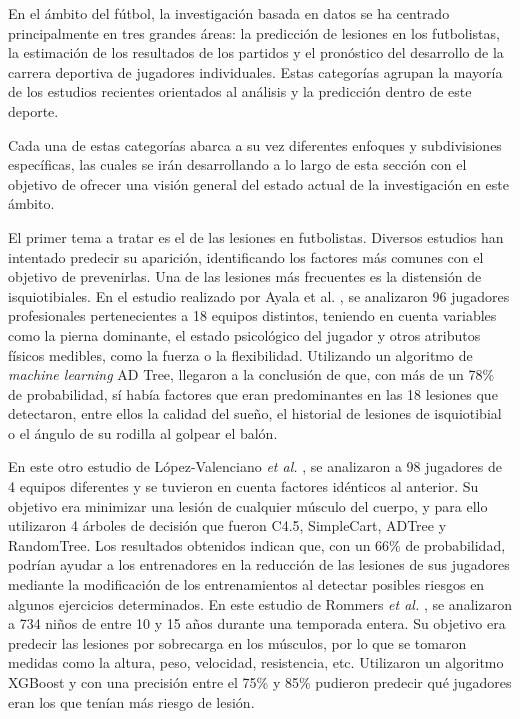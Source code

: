 En el ámbito del fútbol, la investigación basada en datos se ha centrado principalmente en tres grandes áreas: la predicción de lesiones en los futbolistas, la estimación de los resultados de los partidos y el pronóstico del desarrollo de la carrera deportiva de jugadores individuales. Estas categorías agrupan la mayoría de los estudios recientes orientados al análisis y la predicción dentro de este deporte.

Cada una de estas categorías abarca a su vez diferentes enfoques y subdivisiones específicas, las cuales se irán desarrollando a lo largo de esta sección con el objetivo de ofrecer una visión general del estado actual de la investigación en este ámbito.

El primer tema a tratar es el de las lesiones en futbolistas. Diversos estudios han intentado predecir su aparición, identificando los factores más comunes con el objetivo de prevenirlas. Una de las lesiones más frecuentes es la distensión de isquiotibiales. En el estudio realizado por Ayala et al. \cite{first-injury}, se analizaron 96 jugadores profesionales pertenecientes a 18 equipos distintos, teniendo en cuenta variables como la pierna dominante, el estado psicológico del jugador y otros atributos físicos medibles, como la fuerza o la flexibilidad. Utilizando un algoritmo de \textit{machine learning} AD Tree, llegaron a la conclusión de que, con más de un 78\% de probabilidad, sí había factores que eran predominantes en las 18 lesiones que detectaron, entre ellos la calidad del sueño, el historial de lesiones de isquiotibial o el ángulo de su rodilla al golpear el balón.

En este otro estudio de López-Valenciano \textit{et al.} \cite{second-injury}, se analizaron a 98 jugadores de 4 equipos diferentes y se tuvieron en cuenta factores idénticos al anterior. Su objetivo era minimizar una lesión de cualquier músculo del cuerpo, y para ello utilizaron 4 árboles de decisión que fueron C4.5, SimpleCart, ADTree y RandomTree. Los resultados obtenidos indican que, con un 66\% de probabilidad, podrían ayudar a los entrenadores en la reducción de las lesiones de sus jugadores mediante la modificación de los entrenamientos al detectar posibles riesgos en algunos ejercicios determinados. En este estudio de Rommers \textit{et al.} \cite{third-injury}, se analizaron a 734 niños de entre 10 y 15 años durante una temporada entera. Su objetivo era predecir las lesiones por sobrecarga en los músculos, por lo que se tomaron medidas como la altura, peso, velocidad, resistencia, etc. Utilizaron un algoritmo XGBoost y con una precisión entre el 75\% y 85\% pudieron predecir qué jugadores eran los que tenían más riesgo de lesión.

